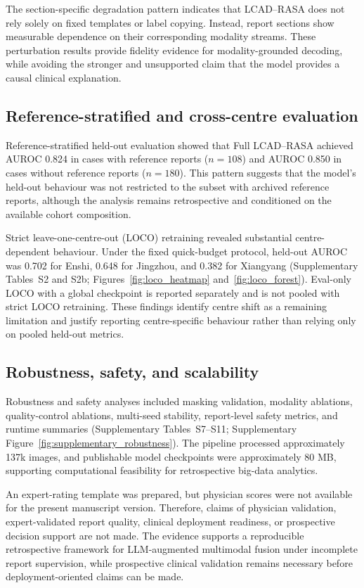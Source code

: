 The section-specific degradation pattern indicates that LCAD--RASA does not rely solely on fixed templates or label copying. Instead, report sections show measurable dependence on their corresponding modality streams. These perturbation results provide fidelity evidence for modality-grounded decoding, while avoiding the stronger and unsupported claim that the model provides a causal clinical explanation.

\subsection{Reference-stratified and cross-centre evaluation}
\label{subsec:loco_results}

Reference-stratified held-out evaluation showed that Full LCAD--RASA achieved AUROC 0.824 in cases with reference reports ($n=108$) and AUROC 0.850 in cases without reference reports ($n=180$). This pattern suggests that the model's held-out behaviour was not restricted to the subset with archived reference reports, although the analysis remains retrospective and conditioned on the available cohort composition.

Strict leave-one-centre-out (LOCO) retraining revealed substantial centre-dependent behaviour. Under the fixed quick-budget protocol, held-out AUROC was 0.702 for Enshi, 0.648 for Jingzhou, and 0.382 for Xiangyang (Supplementary Tables~S2 and S2b; Figures~\ref{fig:loco_heatmap} and~\ref{fig:loco_forest}). Eval-only LOCO with a global checkpoint is reported separately and is not pooled with strict LOCO retraining. These findings identify centre shift as a remaining limitation and justify reporting centre-specific behaviour rather than relying only on pooled held-out metrics.

\subsection{Robustness, safety, and scalability}
\label{subsec:robustness_safety_scalability}

Robustness and safety analyses included masking validation, modality ablations, quality-control ablations, multi-seed stability, report-level safety metrics, and runtime summaries (Supplementary Tables~S7--S11; Supplementary Figure~\ref{fig:supplementary_robustness}). The pipeline processed approximately 137k images, and publishable model checkpoints were approximately 80 MB, supporting computational feasibility for retrospective big-data analytics.

An expert-rating template was prepared, but physician scores were not available for the present manuscript version. Therefore, claims of physician validation, expert-validated report quality, clinical deployment readiness, or prospective decision support are not made. The evidence supports a reproducible retrospective framework for LLM-augmented multimodal fusion under incomplete report supervision, while prospective clinical validation remains necessary before deployment-oriented claims can be made.
